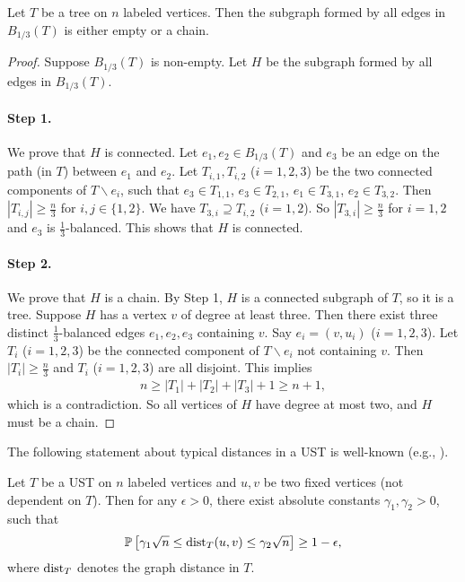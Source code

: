 \begin{lemma} \label{lem:conn:balanced-edge-chain}
  Let $T$ be a tree on $n$ labeled vertices.
  Then the subgraph formed by all edges in $B_{1/3}(T)$ is either empty or a chain.
\end{lemma}
\begin{proof}
  Suppose $B_{1/3}(T)$ is non-empty.
  Let $H$ be the subgraph formed by all edges in $B_{1/3}(T)$.

  \paragraph{Step 1.} We prove that $H$ is connected.
  Let $e_1,e_2\in B_{1/3}(T)$ and $e_3$ be an edge on the path (in $T$) between $e_1$ and $e_2$.
  Let $T_{i,1},T_{i,2}$ ($i=1,2,3$) be the two connected components of $T\backslash e_i$,
  such that $e_3\in T_{1,1}$, $e_3\in T_{2,1}$, $e_1\in T_{3,1}$, $e_2\in T_{3,2}$.
  Then $|T_{i,j}|\ge \frac n3$ for $i,j\in \{1,2\}$.
  We have $T_{3,i} \supseteq T_{i,2}$ ($i=1,2$).
  So $|T_{3,i}| \ge \frac n3$ for $i=1,2$ and $e_3$ is $\frac 13$-balanced.
  This shows that $H$ is connected.

  \paragraph{Step 2.} We prove that $H$ is a chain.
  By Step 1, $H$ is a connected subgraph of $T$, so it is a tree.
  Suppose $H$ has a vertex $v$ of degree at least three.
  Then there exist three distinct $\frac 13$-balanced edges $e_1,e_2,e_3$ containing $v$.
  Say $e_i=(v,u_i)$ ($i=1,2,3$).
  Let $T_i$ ($i=1,2,3$) be the connected component of $T\backslash e_i$ not containing $v$.
  Then $|T_i|\ge \frac n3$ and $T_i$ ($i=1,2,3$) are all disjoint.
  This implies
  \begin{align*}
    n\ge |T_1|+|T_2|+|T_3|+1 \ge n+1,
  \end{align*}
  which is a contradiction.
  So all vertices of $H$ have degree at most two, and $H$ must be a chain.
\end{proof}

The following statement about typical distances in a UST is well-known (e.g., \cite{aldous1991continuum}).
\begin{lemma} \label{lem:conn:ust-dist}
  Let $T$ be a UST on $n$ labeled vertices and $u,v$ be two fixed vertices (not dependent on $T$).
  Then for any $\epsilon>0$, there exist absolute constants $\gamma_1,\gamma_2>0$, such that
  \begin{align*}
    \mathbb{P}\left[ \gamma_1 \sqrt n \le \operatorname{\mathrm{dist}}_T(u,v) \le \gamma_2 \sqrt n \right] \ge 1-\epsilon,
  \end{align*}
  where $\operatorname{\mathrm{dist}}_T$ denotes the graph distance in $T$.
\end{lemma}

